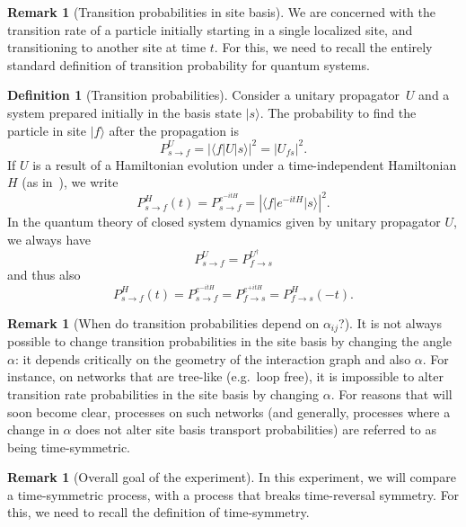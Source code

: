 \documentclass[aps,pra,12pt,nofootinbib,superscriptaddress,longbibliography,showpacs]{revtex4-1}
\theoremstyle{plain}
\theoremstyle{definition}
\newtheorem{definition}[theorem]{Definition}
\newtheorem{remark}[theorem]{Remark}
\newcommand{\bra}[1]{\mbox{$\langle #1|$}}
\newcommand{\ket}[1]{\ensuremath{|#1\rangle}}
\newcommand{\be}{\begin{equation}}
\newcommand{\ee}{\end{equation}}
\begin{document}
\begin{remark}[Transition probabilities in site basis] 
 We are concerned with the transition rate of a particle
initially starting in a single localized site, and transitioning to another
site at time $t$.  For this, we need to recall the entirely standard definition
of transition probability for quantum systems. 
\end{remark}

\begin{definition}[Transition probabilities]
Consider a unitary propagator~$U$ and a system prepared initially in
the basis state $\ket{s}$.  The probability to find the particle
in site $\ket{f}$ after the propagation is
\be
\label{eq:Pdef}
P^U_{s\to f} = |\bra{f} U \ket{s}|^2 = |U_{fs}|^2.
\ee
If $U$ is a result of a Hamiltonian evolution under a time-independent
Hamiltonian $H$ (as in~\cite{Z12}),
we write
\be
P^H_{s\to f}(t) = 
P^{e^{-itH}}_{s\to f} = 
|\bra{f} e^{-itH} \ket{s}|^2.
\ee
In the quantum theory of closed system dynamics given by unitary propagator $U$,
we always have
\be
\label{eq:daggerflip}
P^U_{s\to f} = P^{U^\dagger}_{f\to s}
\ee
and thus also
\be
P^H_{s\to f}(t) =
P^{e^{-itH}}_{s\to f} =
P^{e^{+itH}}_{f\to s} = 
P^H_{f\to s}(-t).
\ee
\end{definition} 



\begin{remark}[When do transition probabilities depend on $\alpha_{ij}$?] 
 It is not always possible to change transition probabilities in the site basis
by
changing the angle $\alpha$: it depends critically on the geometry of the
interaction graph and also $\alpha$. For instance, on networks that are
tree-like (e.g.~loop free), it is impossible to alter transition rate
probabilities in the site basis by changing $\alpha$.  For reasons that will
soon become clear, processes on such networks (and generally, processes where a
change in $\alpha$ does not alter site basis transport probabilities) are
referred to as being time-symmetric.  
\end{remark}


\begin{remark}[Overall goal of the experiment] 
 In this experiment, we will compare a time-symmetric process, with a process
that breaks time-reversal symmetry.  For this, we need to recall the definition
of time-symmetry.  
\end{remark}
 
\end{document}
